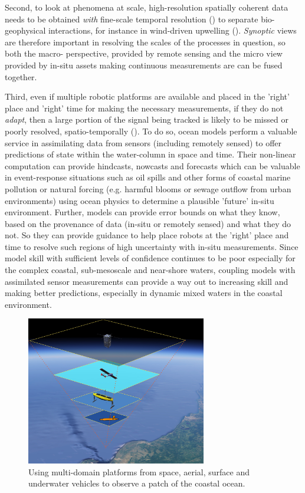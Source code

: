 Second, to look at phenomena at scale, high-resolution spatially
coherent data needs to be obtained \emph{with} fine-scale temporal
resolution () to separate bio-geophysical interactions, for
instance in wind-driven upwelling (). \emph{Synoptic} views
are therefore important in resolving the scales of the processes in
question, so both the macro- perspective, provided by remote sensing
and the micro view provided by in-situ assets making continuous
measurements are can be fused together.

Third, even if multiple robotic platforms are available and placed in
the 'right' place and 'right' time for making the necessary
measurements, if they do not \emph{adapt}, then a large portion of the
signal being tracked is likely to be missed or poorly resolved,
spatio-temporally (). To do so, ocean models perform a
valuable service in assimilating data from sensors (including remotely
sensed) to offer predictions of state within the water-column in space
and time. Their non-linear computation can provide hindcasts, nowcasts
and forecasts which can be valuable in event-response situations such
as oil spills and other forms of coastal marine pollution or natural
forcing (e.g. harmful blooms or sewage outflow from urban
environments) using ocean physics to determine a plausible 'future'
in-situ environment. Further, models can provide error bounds on what
they know, based on the provenance of data (in-situ or remotely
sensed) and what they do not. So they can provide guidance to help
place robots at the 'right' place and time to resolve such regions of
high uncertainty with in-situ measurements.  Since model skill with
sufficient levels of confidence continues to be poor especially for
the complex coastal, sub-mesoscale and near-shore waters, coupling
models with assimilated sensor measurements can provide a way out to
increasing skill and making better predictions, especially in dynamic
mixed waters in the coastal environment.

\begin{figure}[!h]
  \centering
  \includegraphics[width=0.7\textwidth]{fig/inverse-pyramid.jpg}
  \caption{Using multi-domain platforms from space, aerial, surface
    and underwater vehicles to observe a patch of the coastal ocean.}
  \label{fig:inverse}
\end{figure}

